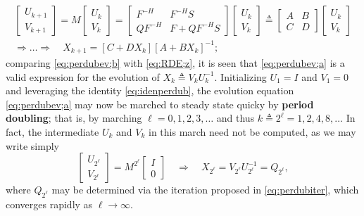\begin{subequations}
\label{eq:perdubev}
\begin{gather}
\begin{bmatrix} U_{k+1} \\ V_{k+1} \end{bmatrix} = M \begin{bmatrix} U_{k} \\ V_{k} \end{bmatrix}
   = \begin{bmatrix} F^{-H} & F^{-H}S \\ Q F^{-H} & F+ Q F^{-H}S \end{bmatrix} \begin{bmatrix} U_{k} \\ V_{k} \end{bmatrix}
   \triangleq \begin{bmatrix} A & B \\ C & D \end{bmatrix}\begin{bmatrix} U_{k} \\ V_{k} \end{bmatrix} \label{eq:perdubev;a} \\
\Rightarrow \ldots \Rightarrow \quad X_{k+1}=[C+D X_k][A+B X_k]^{-1}; \label{eq:perdubev;b}
\end{gather}
\end{subequations}
comparing \eqref{eq:perdubev;b} with \eqref{eq:RDE;z}, it is seen that \eqref{eq:perdubev;a} is a valid expression for the evolution of $X_k \triangleq V_k U_k^{-1}$.  Initializing $U_1=I$ and $V_1=0$ and leveraging the identity \eqref{eq:idenperdub}, the
evolution equation \eqref{eq:perdubev;a} may now be marched to steady state quicky by {\bf period doubling}; that is,
by marching $\ell=0,1,2,3,\ldots$ and thus $k\triangleq 2^\ell=1,2,4,8,\ldots$
In fact, the intermediate $U_k$ and $V_k$ in this march need not be computed, as we may write simply
\begin{equation*}
\begin{bmatrix} U_{2^\ell} \\ V_{2^\ell} \end{bmatrix} = M^{2^\ell} \begin{bmatrix} I \\ 0 \end{bmatrix} \quad \Rightarrow \quad X_{2^\ell} = V_{2^\ell} U_{2^\ell}^{-1} = Q_{2^\ell},
\end{equation*}
where $Q_{2^\ell}$ may be determined via the iteration proposed in \eqref{eq:perdubiter}, which converges rapidly as $\ell \rightarrow \infty$.

